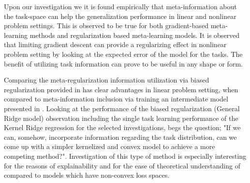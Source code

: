 Upon our investigation we it is found empirically that meta-information about the task-space can help the generalization performance in linear and nonlinear problem settings. This is observed to be true for both gradient-based meta-learning methods and regularization based meta-learning models. It is observed that limiting gradient descent can provide a regularizing effect in nonlinear problem setting by looking at the expected error of the model for the tasks. The benefit of utilizing task information can prove to be useful in any shape or form.

Comparing the meta-regularization information utilization via biased regularization provided in \cite{Denevi2018a} has clear advantages in linear problem setting, when compared to meta-information inclusion via training an intermediate model presented in \cite{Finn2017}. Looking at the performance of the biased regularization (\eg General Ridge model) observation including the single task learning performance of the Kernel Ridge regression for the selected investigations, begs the question; "If we can, somehow, incorporate information regarding the task distribution, can we come up with a simpler kernelized and convex model to achieve a more competing method?". Investigation of this type of method is especially interesting for the reasons of explainability and for the ease of theoretical understanding of compared to models which have non-convex loss spaces.



